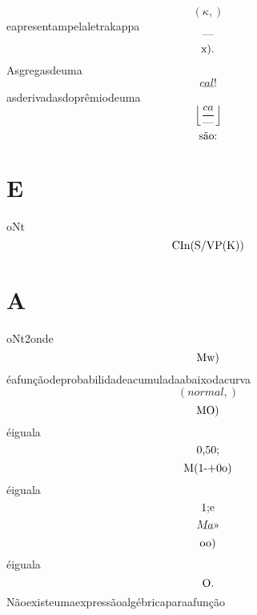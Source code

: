 \documentclass{article}
\begin{document}
\begin{equation}
\left( \kappa,\right)
\end{equation}eapresentampelaletrakappa\begin{equation}
—
\end{equation}\begin{equation}
$x).$
\end{equation}Asgregasdeuma\begin{equation}
cal!
\end{equation}\begin{equation}
—
\end{equation}asderivadasdoprêmiodeuma\begin{equation}
\left\lfloor{\frac{ca}{—}}\right\rfloor
\end{equation}\begin{equation}
$são:$
\end{equation}\section{E}oNt\begin{equation}
$CIn(S/VP(K))$
\end{equation}\section{A}oNt2onde\begin{equation}
$Mw)$
\end{equation}éafunçãodeprobabilidadeacumuladaabaixodacurva\begin{equation}
\left( normal,\right)
\end{equation}\begin{equation}
$MO)$
\end{equation}éiguala\begin{equation}
$0,50;$
\end{equation}\begin{equation}
$M(1-+0o)$
\end{equation}éiguala\begin{equation}
$1;e$
\end{equation}\begin{equation}
Ma»
\end{equation}\begin{equation}
—
\end{equation}\begin{equation}
$oo)$
\end{equation}éiguala\begin{equation}
$O.$
\end{equation}Nãoexisteumaexpressãoalgébricaparaafunção\begin{equation}

\end{equation}
\end{document}
